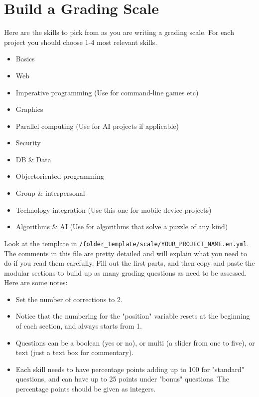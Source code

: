 \documentclass{42-en}
\begin{document}

\chapter{Build a Grading Scale}

Here are the skills to pick from as you are writing a grading scale. For each project you should choose 1-4 most relevant skills. 
\begin{itemize}
	\item Basics
	\item Web
	\item Imperative programming (Use for command-line games etc)
	\item Graphics
	\item Parallel computing (Use for AI projects if applicable)
	\item Security
	\item DB \& Data
	\item Object\-oriented programming
	\item Group \& interpersonal
	\item Technology integration (Use this one for mobile device projects)
	\item Algorithms \& AI (Use for algorithms that solve a puzzle of any kind)
\end{itemize}

Look at the template in \texttt{/folder\_template/scale/YOUR\_PROJECT\_NAME.en.yml}.\\

The comments in this file are pretty detailed and will explain what you need to do if you read them carefully. Fill out the first parts, and then copy and paste the modular sections to build up as many grading questions as need to be assessed. Here are some notes:

\begin{itemize}
	\item Set the number of corrections to 2.
	\item Notice that the numbering for the "position" variable resets at the beginning of each section, and always starts from 1.
	\item Questions can be a boolean (yes or no), or multi (a slider from one to five), or text (just a text box for commentary). 
	\item Each skill needs to have percentage points adding up to 100 for "standard" questions, and can have up to 25 points under "bonus" questions. The percentage points should be given as integers.
\end{itemize}
\end{document}
